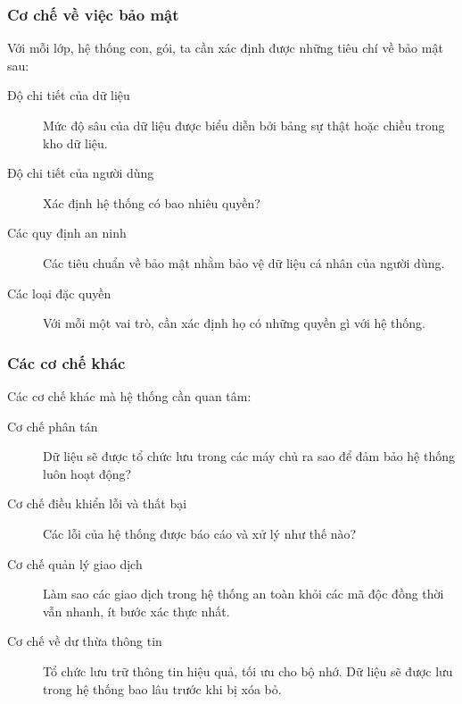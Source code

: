 \documentclass[./../main_file.tex]{subfiles}
\begin{document}
\subsubsection{Cơ chế về việc bảo mật}
Với mỗi lớp, hệ thống con, gói, ta cần xác định được những tiêu chí về bảo mật sau:
\begin{description}
	\item[Độ chi tiết của dữ liệu] Mức độ sâu của dữ liệu được biểu diễn bởi bảng sự thật hoặc chiều trong kho dữ liệu.
	\item[Độ chi tiết của người dùng] Xác định hệ thống có bao nhiêu quyền?
	\item[Các quy định an ninh] Các tiêu chuẩn về bảo mật nhằm bảo vệ dữ liệu cá nhân của người dùng.
	\item[Các loại đặc quyền] Với mỗi một vai trò, cần xác định họ có những quyền gì với hệ thống.
\end{description}

\subsubsection{Các cơ chế khác}
	Các cơ chế khác mà hệ thống cần quan tâm:
\begin{description}
	\item[Cơ chế phân tán] Dữ liệu sẽ được tổ chức lưu trong các máy chủ ra sao để đảm bảo hệ thống luôn hoạt động?
	\item[Cơ chế điều khiển lỗi và thất bại] Các lỗi của hệ thống được báo cáo và xử lý như thế nào?
	\item[Cơ chế quản lý giao dịch] Làm sao các giao dịch trong hệ thống an toàn khỏi các mã độc đồng thời vẫn nhanh, ít bước xác thực nhất. 
	\item[Cơ chế về dư thừa thông tin] Tổ chức lưu trữ thông tin hiệu quả, tối ưu cho bộ nhớ. Dữ liệu sẽ được lưu trong hệ thống bao lâu trước khi bị xóa bỏ.
	
\end{description}
\end{document}

